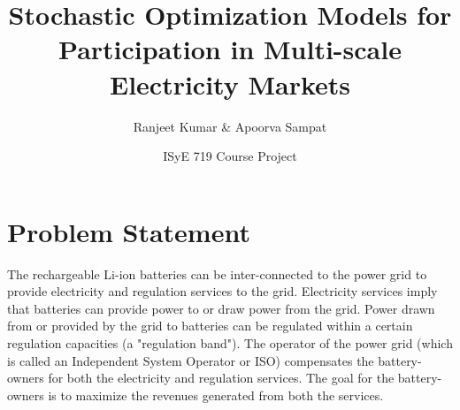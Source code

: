 \documentclass[11pt,twoside]{article}
\title{Stochastic Optimization Models for Participation in Multi-scale Electricity Markets}
\date{ISyE 719 Course Project}
\author{Ranjeet Kumar \& Apoorva Sampat}
\begin{document}
\maketitle

\section{Problem Statement}
The rechargeable Li-ion batteries can be inter-connected to the power grid to provide electricity and regulation services to the grid. Electricity services imply that batteries can provide power to or draw power from the grid. Power drawn from or provided by the grid to batteries can be regulated within a certain regulation capacities (a "regulation band"). The operator of the power grid (which is called an Independent System Operator or ISO) compensates the battery-owners for both the electricity and regulation services. The goal for the battery-owners is to maximize the revenues generated from both the services.
\end{document}
